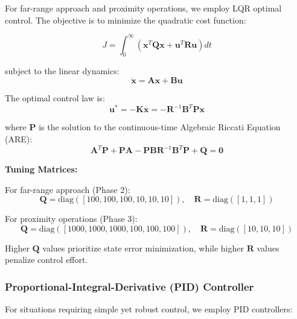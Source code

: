 \documentclass[12pt,a4paper]{article}
\begin{document}
For far-range approach and proximity operations, we employ LQR optimal control. The objective is to minimize the quadratic cost function:

\begin{equation}
J = \int_0^\infty (\mathbf{x}^T\mathbf{Q}\mathbf{x} + \mathbf{u}^T\mathbf{R}\mathbf{u}) dt
\label{eq:lqr_cost}
\end{equation}

subject to the linear dynamics:
\begin{equation}
\dot{\mathbf{x}} = \mathbf{A}\mathbf{x} + \mathbf{B}\mathbf{u}
\label{eq:lqr_dynamics}
\end{equation}

The optimal control law is:
\begin{equation}
\mathbf{u}^* = -\mathbf{K}\mathbf{x} = -\mathbf{R}^{-1}\mathbf{B}^T\mathbf{P}\mathbf{x}
\label{eq:lqr_control}
\end{equation}

where $\mathbf{P}$ is the solution to the continuous-time Algebraic Riccati Equation (ARE):
\begin{equation}
\mathbf{A}^T\mathbf{P} + \mathbf{P}\mathbf{A} - \mathbf{P}\mathbf{B}\mathbf{R}^{-1}\mathbf{B}^T\mathbf{P} + \mathbf{Q} = \mathbf{0}
\label{eq:riccati}
\end{equation}

\textbf{Tuning Matrices:}

For far-range approach (Phase 2):
\begin{equation}
\mathbf{Q} = \text{diag}([100, 100, 100, 10, 10, 10]), \quad \mathbf{R} = \text{diag}([1, 1, 1])
\label{eq:lqr_phase2}
\end{equation}

For proximity operations (Phase 3):
\begin{equation}
\mathbf{Q} = \text{diag}([1000, 1000, 1000, 100, 100, 100]), \quad \mathbf{R} = \text{diag}([10, 10, 10])
\label{eq:lqr_phase3}
\end{equation}

Higher $\mathbf{Q}$ values prioritize state error minimization, while higher $\mathbf{R}$ values penalize control effort.

\subsubsection{Proportional-Integral-Derivative (PID) Controller}

For situations requiring simple yet robust control, we employ PID controllers:
\end{document}
